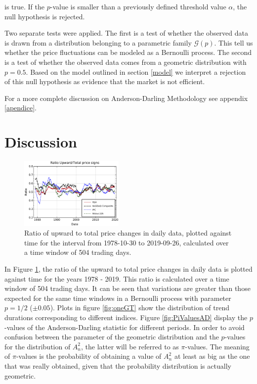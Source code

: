 \documentclass[a4paper]{jpconf}
\begin{document}
\noindent is true. If the $p$-value is smaller than a previously defined threshold value $\alpha$, the null hypothesis is rejected.

Two separate tests were applied. The first is a test of whether the observed data is drawn from a distribution belonging to a parametric family $\mathcal{G}(p)$. This tell us whether the price fluctuations can be modeled as a Bernoulli process. The second is a test of whether the observed data comes from a geometric distribution with $p = 0.5$. Based on the model outlined in section \ref{model} we interpret a rejection of this null hypothesis as evidence that the market is not efficient.

For a more complete discussion on Anderson-Darling Methodology see appendix \ref{apendice}.

\section{Discussion}
\label{discussion}

\begin{figure}
\begin{center}
\includegraphics[width=0.45\textwidth]{img/sign_ratios}
\end{center}
\caption{\small \label{fig:simetria}Ratio of upward to total price changes in daily data, plotted against time for the interval from 1978-10-30 to 2019-09-26, calculated over a time window of 504 trading days.}
\end{figure}

In Figure \ref{fig:simetria}, the ratio of the upward to total price changes in daily data is plotted against time for the years 1978 - 2019. This ratio is calculated over a time window of 504 trading days. It can be seen that variations are greater than those expected for the same time windows in a Bernoulli process with parameter $p = 1/2$ ($\pm{0.05}$). Plots in figure \ref{fig:oneGT} show the distribution of trend durations corresponding to different indices. Figure \ref{fig:PiValuesAD} display the $p$-values of the Anderson-Darling statistic for different periods. In order to avoid confusion between the parameter of the geometric distribution and the $p$-values for the distribution of $A^{2}_{n}$, the latter will be referred to as $\pi$-values. The meaning of $\pi$-values is the probability of obtaining a value of $A^{2}_{n}$ at least as big as the one that was really obtained, given that the probability distribution is actually geometric.
\end{document}
